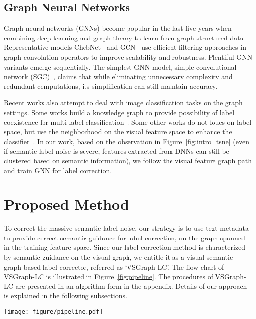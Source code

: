 \documentclass[sigconf]{acmart}
\begin{document}
\subsection{Graph Neural Networks}
\label{sec:related-gnn}
Graph neural networks (GNNs) become popular in the last five years when combining deep learning and graph theory to learn from graph structured data~\cite{wu2020comprehensive,zhou2018graph}.
Representative models ChebNet~\cite{defferrard2016convolutional} and GCN~\cite{kipf2016semi} use efficient filtering approaches in graph convolution operators to improve scalability and robustness. Plentiful GNN variants emerge sequentially. The simplest GNN model, simple convolutional network (SGC)~\cite{wu2019simplifying}, claims that while eliminating unnecessary complexity and redundant computations, its simplification can still maintain accuracy.

Recent works also attempt to deal with image classification tasks on the graph settings. Some works build a knowledge graph to provide possibility of label coexistence for multi-label classification~\cite{chen2019multi}. 
Some other works do not foucs on label space, but use the neighborhood on the visual feature space to enhance the classifier~\cite{yang2019learning,iscen2019label}.
In our work, based on the observation in Figure~\ref{fig:intro_tsne} (even if semantic label noise is severe, features extracted from DNNs can still be clustered based on semantic information), we follow the visual feature graph path and train GNN for label correction.

\section{Proposed Method}
To correct the massive semantic label noise, our strategy is to use text metadata to provide correct semantic guidance for label correction, on the graph spanned in the training feature space. 
Since our label correction method is characterized by semantic guidance on the visual graph, we entitle it as a visual-semantic graph-based label corrector, referred as `VSGraph-LC'. 
The flow chart of VSGraph-LC is illustrated in Figure~\ref{fig:pipeline}. 
The procedures of VSGraph-LC are presented in an algorithm form in the appendix. 
Details of our approach is explained in the following subsections.



\begin{figure*}[t]
	\centering
	\texttt{[image: figure/pipeline.pdf]}
	\caption{Pipeline of VSGraph-LC. The aim is to provide final labels that are more reliable than web labels for later finetuning. A metadata-based anchor selector is built firstly to provide guidance for GNN training. GNN and CNN labels are the predictions of GNN and the pretrained CNN model, respectively. The final labels take advantages of both CNN and GNN labels}
	\label{fig:pipeline}
\end{figure*}
\end{document}
